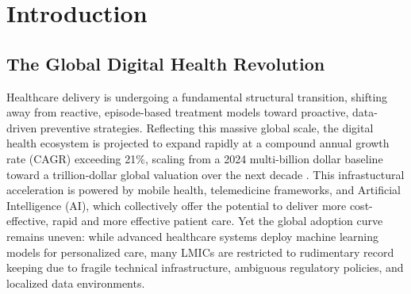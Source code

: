 \chapter{Introduction}
\label{chap:intro}
\section{The Global Digital Health Revolution}
\hspace*{2em}Healthcare delivery is undergoing a fundamental structural transition, shifting away from reactive, episode-based treatment models toward proactive, data-driven preventive strategies. 
Reflecting this massive global scale, the digital health ecosystem is projected to expand rapidly at a compound annual growth rate (CAGR) exceeding 21\%, scaling from a 2024 multi-billion dollar baseline toward a trillion-dollar global valuation over the next decade \cite{global_market_insights_2025, marketsandmarkets_2025}.
This infrastuctural acceleration is powered by mobile health, telemedicine frameworks, and Artificial Intelligence (AI), 
which collectively offer the potential to deliver more cost-effective, rapid and more effective patient care. 
Yet the global adoption curve remains uneven: while advanced healthcare systems deploy machine learning models for personalized care, 
many \ac{LMICs} are restricted to rudimentary record keeping due to fragile technical infrastructure, ambiguous regulatory policies, and localized data environments.

